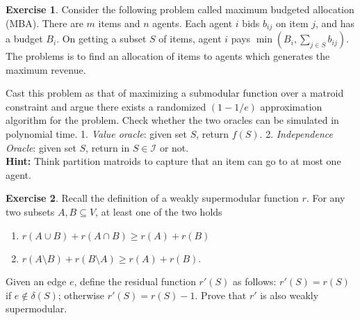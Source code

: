 \documentclass[11pt]{article}
\theoremstyle{definition}
\newtheorem{exercise}{Exercise}
\begin{document}
\iffalse
Solve LP. Let $A := \{v: y_v \le 1/3\}, B := \{v: y_v \ge 2/3\}$ and $C := \{v: 1/3 < y_v < 2/3 \}$.
Consider an arc $(u,v)$ with both endpoints in $A$: since $y_v \le 1/3$ we have $x_{uv} \le 1/3$.
Similarly an arc $(u,v)$ contained in $B$ has $x_{uv} \le 1/3$ since $y_u \ge 2/3$. An arc 
$(u,v)$ in $C$ has $x_{uv} < 1/3$ since 
\fi

\vspace{2ex}
\begin{exercise}
Consider the following problem called maximum budgeted allocation (MBA).
There are $m$ items and $n$ agents. Each agent $i$ bids $b_{ij}$ on item $j$,
and has a budget $B_i$. On getting a subset $S$ of items, agent $i$ pays 
$\min\left(B_i,\sum_{j\in S}b_{ij}\right)$. The problems is to find an allocation of items
to agents which generates the maximum revenue. 

Cast this problem as that of maximizing a submodular function over a matroid constraint
and argue there exists a randomized $(1-1/e)$ approximation algorithm for the problem.
Check whether the two oracles can be simulated in polynomial time.
1. {\em Value oracle}: given set $S$, return $f(S)$. 2. {\em Independence Oracle}:
given set $S$, return in $S\in \mathcal{I}$ or not. \\
\noindent
{\bf Hint:} Think partition matroids to capture that an item can go to at most one agent.

\end{exercise}


\vspace{1ex}
\begin{exercise}
Recall the definition of a  weakly supermodular function $r$.
For any two subsets $A,B\subseteq V$, at least one of the two holds
\begin{enumerate}
\item $r(A \cup B) + r(A \cap B) \ge r(A) + r(B)$
\item $r(A \setminus B) + r(B \setminus A) \ge r(A) + r(B)$.
\end{enumerate}
\noindent
Given an edge $e$, define the residual function $r'(S)$ as follows: $r'(S) = r(S)$ if $e\notin \delta(S)$; 
otherwise $r'(S) = r(S) - 1$. Prove that $r'$ is also weakly supermodular.
\end{exercise}
\end{document}
